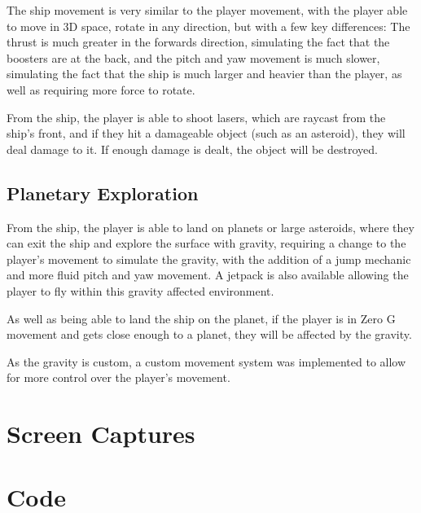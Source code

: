 \documentclass[final]{cmpreport}
\begin{document}
    The ship movement is very similar to the player movement, with the player able to move in 3D space, rotate in any
    direction, but with a few key differences:
    The thrust is much greater in the forwards direction, simulating the fact that the boosters are at the back, and
    the pitch and yaw movement is much slower, simulating the fact that the ship is much larger and heavier than the
    player, as well as requiring more force to rotate.

    From the ship, the player is able to shoot lasers, which are raycast from the ship's front, and if they hit a
    damageable object (such as an asteroid), they will deal damage to it.
    If enough damage is dealt, the object will be destroyed.

    \subsection{Planetary Exploration}\label{subsec:planetary}

    From the ship, the player is able to land on planets or large asteroids, where they can exit the ship and explore
    the surface with gravity, requiring a change to the player's movement to simulate the gravity, with the addition of
    a jump mechanic and more fluid pitch and yaw movement.
    A jetpack is also available allowing the player to fly within this gravity affected environment.

    As well as being able to land the ship on the planet, if the player is in Zero G movement and gets close enough
    to a planet, they will be affected by the gravity.

    As the gravity is custom, a custom movement system was implemented to allow for more control over the player's
    movement.

    \appendix

    \section{Screen Captures}\label{sec:screen-captures}

    \section{Code}\label{sec:code}
\end{document}
